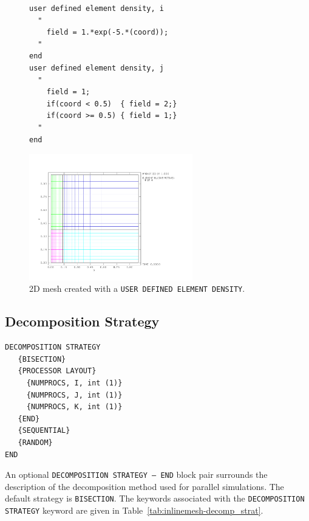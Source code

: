 \begin{figure}[htbp]
  \centering
    \begin{minipage}{0.5\linewidth}
{\ttfamily \begin{verbatim}
user defined element density, i
  "
    field = 1.*exp(-5.*(coord));
  "
end
user defined element density, j
  "
    field = 1;
    if(coord < 0.5)  { field = 2;}
    if(coord >= 0.5) { field = 1;}
  "
end
\end{verbatim}}
    \end{minipage}%
    \hfill
    \begin{minipage}{0.45\linewidth}
      \centering
        \includegraphics[width=2.8in]{bias_example}
    \end{minipage}
    \caption{2D mesh created with a \texttt{USER
      DEFINED ELEMENT DENSITY}.}
    \label{fig:bias_example}
\end{figure}

\renewcommand{\textfraction}{0.2}
\renewcommand{\topfraction}{0.7}
\renewcommand{\bottomfraction}{0.3}
\renewcommand{\floatpagefraction}{0.5}

\clearpage
\subsection{Decomposition Strategy}
\label{sec:inline-decomposition-strategy}

{\ttfamily \begin{verbatim}
DECOMPOSITION STRATEGY
   {BISECTION}
   {PROCESSOR LAYOUT}
     {NUMPROCS, I, int (1)}
     {NUMPROCS, J, int (1)}
     {NUMPROCS, K, int (1)}
   {END}
   {SEQUENTIAL}
   {RANDOM}
END
\end{verbatim}
}

An optional \texttt{DECOMPOSITION STRATEGY -- END} block pair surrounds the description
of the decomposition method used for parallel simulations. The default strategy is \texttt{BISECTION}. The keywords associated
with the \texttt{DECOMPOSITION STRATEGY} keyword are given in
Table~\ref{tab:inlinemesh-decomp_strat}.

